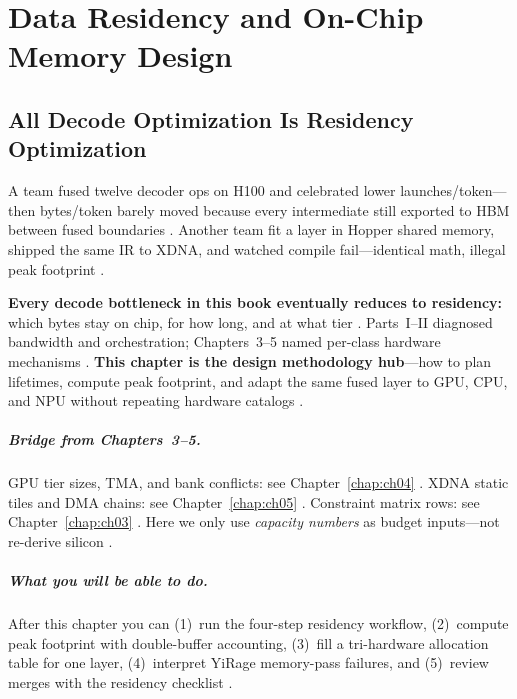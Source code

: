 \chapter{Data Residency and On-Chip Memory Design}
\label{chap:ch06}

\section{All Decode Optimization Is Residency Optimization}
\label{sec:industrial_hook}

A team fused twelve decoder ops on H100 and celebrated lower launches/token---then bytes/token barely moved because every intermediate still exported to HBM between fused boundaries \citep{taxbreak2026,memoryfloor2026}.
Another team fit a layer in Hopper shared memory, shipped the same IR to XDNA, and watched compile fail---identical math, illegal peak footprint \citep{yirage2026,amd2024xdna,nvidia2022hopper}.

\textbf{Every decode bottleneck in this book eventually reduces to residency:} which bytes stay on chip, for how long, and at what tier \citep{dao2022flashattention,chen2020compilerbasedhardw}.
Parts~I--II diagnosed bandwidth and orchestration; Chapters~3--5 named per-class hardware mechanisms \citep{patel2025llminference}.
\textbf{This chapter is the design methodology hub}---how to plan lifetimes, compute peak footprint, and adapt the same fused layer to GPU, CPU, and NPU without repeating hardware catalogs \citep{yirage2026,dlbook}.

\paragraph{Bridge from Chapters~3--5.}
GPU tier sizes, TMA, and bank conflicts: see Chapter~\ref{chap:ch04} \citep{nvidia2022hopper,semianalysis2024tma}.
XDNA static tiles and DMA chains: see Chapter~\ref{chap:ch05} \citep{amd2024xdna,amd2024aie}.
Constraint matrix rows: see Chapter~\ref{chap:ch03} \citep{chen2020compilerbasedhardw}.
Here we only use \emph{capacity numbers} as budget inputs---not re-derive silicon \citep{yirage2026}.

\paragraph{What you will be able to do.}
After this chapter you can (1)~run the four-step residency workflow, (2)~compute peak footprint with double-buffer accounting, (3)~fill a tri-hardware allocation table for one layer, (4)~interpret YiRage memory-pass failures, and (5)~review merges with the residency checklist \citep{yirage2026,taxbreak2026,memoryfloor2026}.

